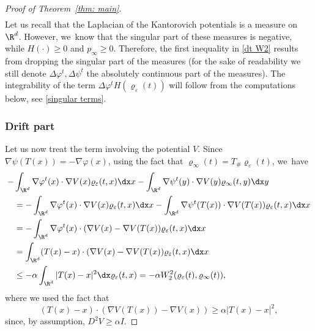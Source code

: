 \begin{proof}[Proof of Theorem~\ref{thm: main}]
\begin{multline}
\end{multline}
Let us recall that the Laplacian of the Kantorovich potentials is a measure on $\R^d$. However, we~know that the singular part of these measures is negative, while $H(\cdot)\geq 0$ and $p_\infty\geq 0$. Therefore, the first inequality in \eqref{dt W2} results from dropping the singular part of the measures (for the sake of readability we still denote $\Delta \varphi^t, \Delta \psi^t$ the absolutely continuous part of the measures). The integrability of the term $\Delta \varphi^t H(\varrho_\varepsilon(t))$ will follow from the computations below, see \eqref{singular terms}.

\subsubsection*{Drift part}
Let us now treat the term involving the potential $V$.
Since $\nabla \psi (T(x))=- \nabla \varphi(x)$, using the fact that $\varrho_\infty(t) = T_\#\varrho_\varepsilon(t)$, we~have\vspace*{-2pt}
\begin{align*}
- &\int_{\R^d} \nabla \varphi^t(x) \cdot \nabla V(x) \varrho_\varepsilon(t,x)\dx x -\int_{\R^d} \nabla \psi^t(y) \cdot \nabla V(y) \varrho_\infty(t,y) \dx y\\
&=- \int_{\R^d} \nabla \varphi^t(x) \cdot \nabla V(x) \varrho_\varepsilon(t,x)\dx x - \int_{\R^d} \nabla \psi^t(T(x)) \cdot \nabla V(T(x)) \varrho_\varepsilon(t,x) \dx x\\
&=- \int_{\R^d} \nabla \varphi^t(x) \cdot (\nabla V(x)- \nabla V(T(x)) \varrho_\varepsilon(t,x) \dx x\\
&= \int_{\R^d} (T(x)-x) \cdot (\nabla V(x)- \nabla V(T(x)) \varrho_\varepsilon{(t,x)} \dx x\\
&\leq - \alpha \int_{\R^d} |T(x)-x|^2 \dx \varrho_\varepsilon(t,x)= -\alpha W_2^2(\varrho_\varepsilon(t),\varrho_\infty(t)),
\end{align*}
where we used the fact that
\begin{equation*}
(T(x)- x) \cdot (\nabla V(T(x))- \nabla V(x)) \geq \alpha |T(x)- x|^2,
\end{equation*}
since, by assumption, $D^2 V\ge \alpha I$.


\end{proof}

